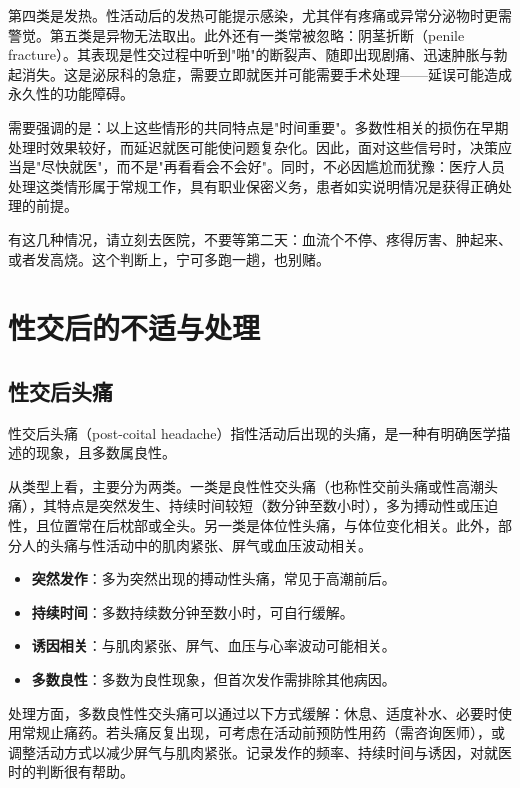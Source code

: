 \documentclass[12pt,UTF8]{ctexbook}
\newcommand{\keyword}[1]{\textbf{#1}}
\begin{document}
第四类是发热。性活动后的发热可能提示感染，尤其伴有疼痛或异常分泌物时更需警觉。第五类是异物无法取出。此外还有一类常被忽略：阴茎折断（penile fracture）。其表现是性交过程中听到"啪"的断裂声、随即出现剧痛、迅速肿胀与勃起消失。这是泌尿科的急症，需要立即就医并可能需要手术处理——延误可能造成永久性的功能障碍。

需要强调的是：以上这些情形的共同特点是"时间重要"。多数性相关的损伤在早期处理时效果较好，而延迟就医可能使问题复杂化。因此，面对这些信号时，决策应当是"尽快就医"，而不是"再看看会不会好"。同时，不必因尴尬而犹豫：医疗人员处理这类情形属于常规工作，具有职业保密义务，患者如实说明情况是获得正确处理的前提。

\begin{tcolorbox}[colback=pink!5!white,colframe=red!50!black,title=贴心小叮咛]
有这几种情况，请立刻去医院，不要等第二天：血流个不停、疼得厉害、肿起来、或者发高烧。这个判断上，宁可多跑一趟，也别赌。
\end{tcolorbox}

\section{性交后的不适与处理}
\subsection{性交后头痛}

性交后头痛（post-coital headache）指性活动后出现的头痛，是一种有明确医学描述的现象，且多数属良性。

从类型上看，主要分为两类。一类是良性性交头痛（也称性交前头痛或性高潮头痛），其特点是突然发生、持续时间较短（数分钟至数小时），多为搏动性或压迫性，且位置常在后枕部或全头。另一类是体位性头痛，与体位变化相关。此外，部分人的头痛与性活动中的肌肉紧张、屏气或血压波动相关。

\begin{itemize}
  \item \keyword{突然发作}：多为突然出现的搏动性头痛，常见于高潮前后。
  \item \keyword{持续时间}：多数持续数分钟至数小时，可自行缓解。
  \item \keyword{诱因相关}：与肌肉紧张、屏气、血压与心率波动可能相关。
  \item \keyword{多数良性}：多数为良性现象，但首次发作需排除其他病因。
\end{itemize}

处理方面，多数良性性交头痛可以通过以下方式缓解：休息、适度补水、必要时使用常规止痛药。若头痛反复出现，可考虑在活动前预防性用药（需咨询医师），或调整活动方式以减少屏气与肌肉紧张。记录发作的频率、持续时间与诱因，对就医时的判断很有帮助。
\end{document}
